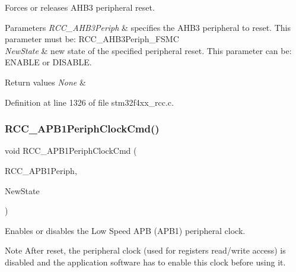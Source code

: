 Forces or releases A\+H\+B3 peripheral reset. 


\begin{DoxyParams}{Parameters}
{\em R\+C\+C\+\_\+\+A\+H\+B3\+Periph} & specifies the A\+H\+B3 peripheral to reset. This parameter must be\+: R\+C\+C\+\_\+\+A\+H\+B3\+Periph\+\_\+\+F\+S\+MC \\
\hline
{\em New\+State} & new state of the specified peripheral reset. This parameter can be\+: E\+N\+A\+B\+LE or D\+I\+S\+A\+B\+LE. \\
\hline
\end{DoxyParams}

\begin{DoxyRetVals}{Return values}
{\em None} & \\
\hline
\end{DoxyRetVals}


Definition at line 1326 of file stm32f4xx\+\_\+rcc.\+c.

\mbox{\label{group___r_c_c___group3_gaee7cc5d73af7fe1986fceff8afd3973e}} 
\subsubsection{\texorpdfstring{R\+C\+C\+\_\+\+A\+P\+B1\+Periph\+Clock\+Cmd()}{RCC\_APB1PeriphClockCmd()}}
{\footnotesize\ttfamily void R\+C\+C\+\_\+\+A\+P\+B1\+Periph\+Clock\+Cmd (\begin{DoxyParamCaption}\item[{uint32\+\_\+t}]{R\+C\+C\+\_\+\+A\+P\+B1\+Periph,  }\item[{Functional\+State}]{New\+State }\end{DoxyParamCaption})}



Enables or disables the Low Speed A\+PB (A\+P\+B1) peripheral clock. 

\begin{DoxyNote}{Note}
After reset, the peripheral clock (used for registers read/write access) is disabled and the application software has to enable this clock before using it. 
\end{DoxyNote}

